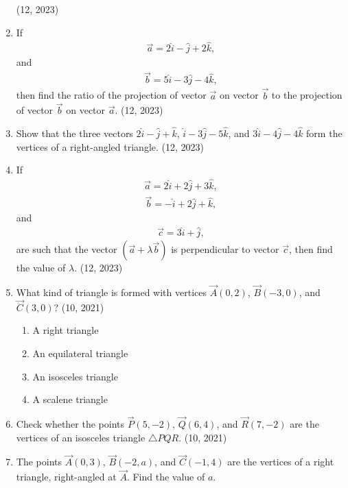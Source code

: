 \begin{enumerate}[label=\thesubsection.\arabic*, ref=\thesubsection.\theenumi]
    \hfill (12, 2023)
    \item If
    \begin{align*}
        \overrightarrow{a} = 2\hat{i} - \hat{j} + 2\hat{k},
    \end{align*}
    and
    \begin{align*}
        \overrightarrow{b} = 5\hat{i} - 3\hat{j} - 4\hat{k},
    \end{align*}
    then find the ratio of the projection of vector $\overrightarrow{a}$ on vector $\overrightarrow{b}$ to the projection of vector $\overrightarrow{b}$ on vector $\overrightarrow{a}$.
    \hfill (12, 2023)

    \item Show that the three vectors $2\hat{i} - \hat{j} + \hat{k}$, $\hat{i} - 3\hat{j} - 5\hat{k}$, and $3\hat{i} - 4\hat{j} - 4\hat{k}$ form the vertices of a right-angled triangle. 
    \hfill (12, 2023)
    \item If
    \begin{align*}
        \overrightarrow{a} = 2\hat{i} + 2\hat{j} + 3\hat{k},
    \end{align*}
    \begin{align*}
        \overrightarrow{b} = -\hat{i} + 2\hat{j} + \hat{k},
    \end{align*}
    and
    \begin{align*}
        \overrightarrow{c} = 3\hat{i} + \hat{j},
    \end{align*}
    are such that the vector $(\overrightarrow{a} + \lambda \overrightarrow{b})$ is perpendicular to vector $\overrightarrow{c}$, then find the value of $\lambda$.
    \hfill (12, 2023)
		\item What kind of triangle is formed with vertices $\vec{A}(0, 2)$, $\vec{B}(-3, 0)$, and $\vec{C}(3, 0)$?
		\hfill (10, 2021)
		\begin{enumerate}
			\item A right triangle
			\item An equilateral triangle
			\item An isosceles triangle
			\item A scalene triangle
		\end{enumerate}
		\item Check whether the points $\vec{P}(5, -2)$, $\vec{Q}(6, 4)$, and $\vec{R}(7, -2)$ are the vertices of an isosceles triangle $\triangle PQR$. \hfill (10, 2021)
		\item The points $\vec{A}(0, 3)$, $\vec{B}(-2, a)$, and $\vec{C}(-1, 4)$ are the vertices of a right triangle, right-angled at $\vec{A}$. Find the value of $a$.


\end{enumerate}
